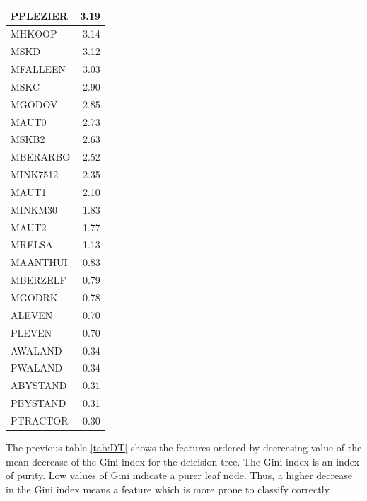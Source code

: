 \documentclass[
  12pt,
  oneside]{report}
\begin{document}
\begin{table}[H]
\begin{tabular}[t]{l|r}
\hline
PPLEZIER & 3.19\\
\hline
MHKOOP & 3.14\\
\hline
MSKD & 3.12\\
\hline
MFALLEEN & 3.03\\
\hline
MSKC & 2.90\\
\hline
MGODOV & 2.85\\
\hline
MAUT0 & 2.73\\
\hline
MSKB2 & 2.63\\
\hline
MBERARBO & 2.52\\
\hline
MINK7512 & 2.35\\
\hline
MAUT1 & 2.10\\
\hline
MINKM30 & 1.83\\
\hline
MAUT2 & 1.77\\
\hline
MRELSA & 1.13\\
\hline
MAANTHUI & 0.83\\
\hline
MBERZELF & 0.79\\
\hline
MGODRK & 0.78\\
\hline
ALEVEN & 0.70\\
\hline
PLEVEN & 0.70\\
\hline
AWALAND & 0.34\\
\hline
PWALAND & 0.34\\
\hline
ABYSTAND & 0.31\\
\hline
PBYSTAND & 0.31\\
\hline
PTRACTOR & 0.30\\
\hline
\end{tabular}
\end{table}

The previous table \ref{tab:DT} shows the features ordered by decreasing value of the mean decrease of the Gini index for the deicision tree. The Gini index is an index of purity. Low values of Gini indicate a purer leaf node. Thus, a higher decrease in the Gini index means a feature which is more prone to classify correctly.
\end{document}
